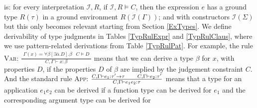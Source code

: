 \documentclass{article}
\newcommand{\tmname}[1]{\textsc{#1}}
\begin{document}
is: for every interpretation $\mathcal{I}, R$, if $\mathcal{I}, R \vDash C$,
then the expression $e$ has a ground type $R (\tau)$ in a ground environment
$R (\mathcal{I}(\Gamma))$; and with constructors $\mathcal{I} (\Sigma)$ but
this only becomes relevant starting from Section \ref{ExTypes}. We define
derivability of type judgments in Tables \ref{TypRulExpr} and
\ref{TypRulClaus}, where we use pattern-related derivations from Table
\ref{TypRulPat}. For example, the rule {\tmname{Var}}:
$\frac{\begin{array}{ll}
  \Gamma (x) = \forall \beta [\exists \bar{\alpha} .D] . \beta & C \vDash D
\end{array}}{C, \Gamma \vdash x : \beta}$ means that we can derive a type
$\beta$ for $x$, with properties $D$, if the properties $D$ of $\beta$ are
implied by the judgement constraint $C$. And the standard rule {\tmname{App}}:
$\frac{C, \Gamma \vdash e_1 : \tau^{\prime} \rightarrow \tau \hspace{1.8em} C,
\Gamma \vdash e_2 : \tau^{\prime}}{C, \Gamma \vdash e_1 e_2 : \tau}$ means
that a type for an application $e_1 e_2$ can be derived if a function type can
be derived for $e_1$ and the corresponding argument type can be derived for
\end{document}
